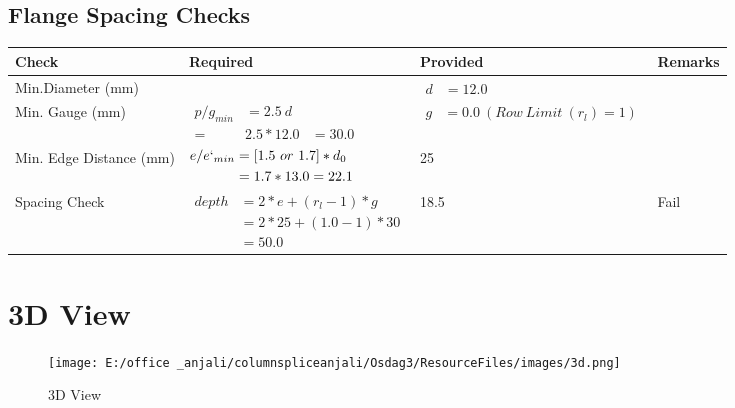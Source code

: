 \documentclass{article}%
\begin{document}
%
\newpage%
\subsection{Flange Spacing Checks}%
\label{subsec:FlangeSpacingChecks}%
\renewcommand{\arraystretch}{1.2}%
\begin{longtable}{|p{2.5cm}|p{7.5cm}|p{5cm}|p{1cm}|}%
\hline%
\rowcolor{OsdagGreen}%
Check&Required&Provided&Remarks\\%
\hline%
\endhead%
\hline%
Min.Diameter (mm)&&$\begin{aligned} d &=12.0\end{aligned}$&\\%
\hline%
Min. Gauge (mm)&$\begin{aligned}p/g_{min}&= 2.5 ~ d&\\ =&2.5*12.0&=30.0\end{aligned}$&$\begin{aligned} g &=0.0~(Row~Limit~(r_l) = 1)\end{aligned}$&\\%
\hline%
Min. Edge Distance (mm)&$\begin{aligned}e/e`_{min} &=[1.5~or~ 1.7] * d_0\\ &=1.7*13.0=22.1 \end{aligned}$&25&\\%
\hline%
Spacing Check&$\begin{aligned} depth & = 2 * e + (r_l -1) * g\\ & = 2 * 25+(1.0-1)*30\\ & = 50.0\end{aligned}$&18.5&Fail\\%
\hline%
\end{longtable}

%
%
\newpage%
\section{3D View}%
\label{sec:3DView}%


\begin{figure}[h!]%
\centering%
\texttt{[image: E:/office \_anjali/columnspliceanjali/Osdag3/ResourceFiles/images/3d.png]}%
\caption{3D View}%
\end{figure}

%
\end{document}
